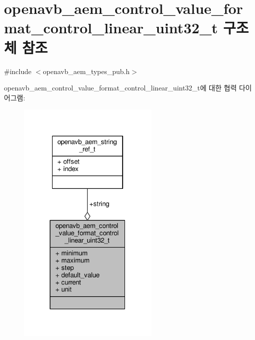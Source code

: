 \hypertarget{structopenavb__aem__control__value__format__control__linear__uint32__t}{}\section{openavb\+\_\+aem\+\_\+control\+\_\+value\+\_\+format\+\_\+control\+\_\+linear\+\_\+uint32\+\_\+t 구조체 참조}
\label{structopenavb__aem__control__value__format__control__linear__uint32__t}


{\ttfamily \#include $<$openavb\+\_\+aem\+\_\+types\+\_\+pub.\+h$>$}



openavb\+\_\+aem\+\_\+control\+\_\+value\+\_\+format\+\_\+control\+\_\+linear\+\_\+uint32\+\_\+t에 대한 협력 다이어그램\+:
\nopagebreak
\begin{figure}[H]
\begin{center}
\leavevmode
\includegraphics[width=193pt]{structopenavb__aem__control__value__format__control__linear__uint32__t__coll__graph}
\end{center}
\end{figure}
